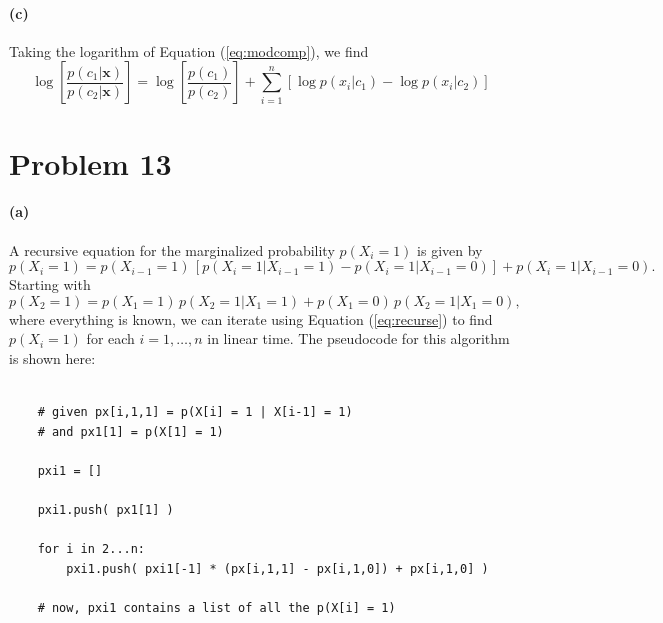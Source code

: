\documentclass[11pt]{article}
\newcommand{\eq}[1]{Equation (\ref{eq:#1})}
\newcommand{\eqlabel}[1]{\label{eq:#1}}
\newcommand{\pr}[1]{\ensuremath{p(#1)}}
\newcommand{\bvec}[1]{\ensuremath{\boldsymbol{#1}}}
\begin{document}
\paragraph{(c)}

Taking the logarithm of \eq{modcomp}, we find
\begin{equation}
    \log \left [ \frac{\pr{c_1 | \bvec{x}}}{\pr{c_2 | \bvec{x}}} \right ]
        = \log \left [ \frac{\pr{c_1}}{\pr{c_2}} \right ] +
            \sum_{i=1}^n
            \left [ \log \pr{x_i | c_1} - \log \pr{x_i | c_2} \right ]
\end{equation}


\section{Problem 13}

\paragraph{(a)}

A recursive equation for the marginalized probability $\pr{X_i = 1}$ is given
by
\begin{equation}\eqlabel{recurse}
    \pr{X_i=1} = \pr{X_{i-1} = 1}
        \, \left [ \pr{X_i =1 | X_{i-1} = 1}
            - \pr{X_i =1 | X_{i-1} = 0} \right ]
        + \pr{X_i =1 | X_{i-1} = 0}.
\end{equation}
Starting with
\begin{equation}
    \pr{X_2=1} = \pr{X_{1} = 1} \, \pr{X_2 =1 | X_1 = 1}
               + \pr{X_{1} = 0} \, \pr{X_2 =1 | X_1 = 0},
\end{equation}
where everything is known, we can iterate using \eq{recurse} to find
$\pr{X_i = 1}$ for each $i=1, \ldots, n$ in linear time. The pseudocode
for this algorithm is shown here:

\begin{lstlisting}

    # given px[i,1,1] = p(X[i] = 1 | X[i-1] = 1)
    # and px1[1] = p(X[1] = 1)

    pxi1 = []

    pxi1.push( px1[1] )

    for i in 2...n:
        pxi1.push( pxi1[-1] * (px[i,1,1] - px[i,1,0]) + px[i,1,0] )

    # now, pxi1 contains a list of all the p(X[i] = 1)

\end{lstlisting}
\end{document}
